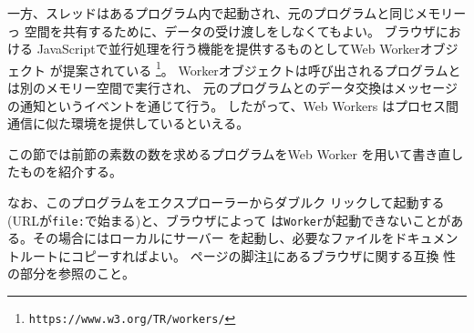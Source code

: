 一方、スレッドはあるプログラム内で起動され、元のプログラムと同じメモリーっ
空間を共有するために、データの受け渡しをしなくてもよい。
\fi
ブラウザにおける
JavaScriptで並行処理を行う機能を提供するものとしてWeb Workerオブジェクト
が提案されている
\footnote{\texttt{https://www.w3.org/TR/workers/}\label{webworkers}}。
Workerオブジェクトは呼び出されるプログラムとは別のメモリー空間で実行され、
元のプログラムとのデータ交換はメッセージの通知というイベントを通じて行う。
したがって、Web Workers はプロセス間通信に似た環境を提供しているといえる。

この節では前節の素数の数を求めるプログラムをWeb Worker を用いて書き直し
 たものを紹介する。

 なお、このプログラムをエクスプローラーからダブルク
 リックして起動する(URLが\texttt{file:}で始まる)と、ブラウザによって
 は\texttt{Worker}が起動できないことがある。その場合にはローカルにサーバー
 を起動し、必要なファイルをドキュメントルートにコピーすればよい。
 \pageref{webworkers}ページの脚注\ref{webworkers}にあるブラウザに関する互換
 性の部分を参照のこと。

